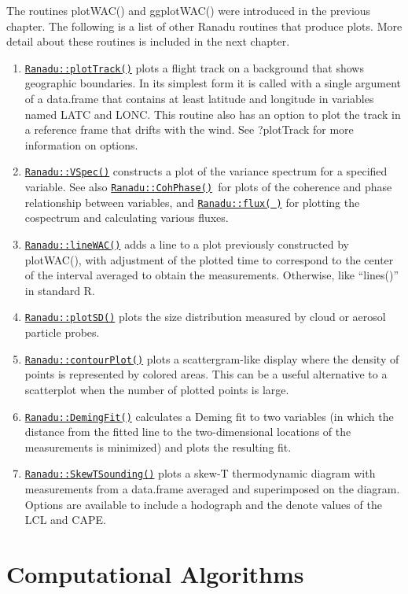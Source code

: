 \documentclass[12pt,english]{report}\usepackage[]{graphicx}\usepackage[]{color}
\begin{document}
The routines plotWAC() and ggplotWAC() were introduced in the previous
chapter. The following is a list of other Ranadu routines that produce
plots. More detail about these routines is included in the next chapter.
\begin{enumerate}
\item \texttt{\uline{Ranadu::plotTrack()}} plots a flight track on a
background that shows geographic boundaries. In its simplest form
it is called with a single argument of a data.frame that contains
at least latitude and longitude in variables named LATC and LONC.
This routine also has an option to plot the track in a reference frame
that drifts with the wind. See ?plotTrack for more information on
options.
\item \texttt{\uline{Ranadu::VSpec()}} constructs a plot of the variance
spectrum for a specified variable. See also \texttt{\uline{Ranadu::CohPhase()}}\texttt{
}for plots of the coherence and phase relationship between variables,
and \texttt{\uline{Ranadu::flux( )}} for plotting the cospectrum
and calculating various fluxes.
\item \texttt{\uline{Ranadu::lineWAC()}} adds a line to a plot previously
constructed by plotWAC(), with adjustment of the plotted time to correspond
to the center of the interval averaged to obtain the measurements.
Otherwise, like ``lines()'' in standard R.
\item \texttt{\uline{Ranadu::plotSD()}} plots the size distribution measured
by cloud or aerosol particle probes.
\item \texttt{\uline{Ranadu::contourPlot()}} plots a scattergram-like
display where the density of points is represented by colored areas.
This can be a useful alternative to a scatterplot when the number
of plotted points is large.
\item \texttt{\uline{Ranadu::DemingFit()}} calculates a Deming fit to
two variables (in which the distance from the fitted line to the two-dimensional
locations of the measurements is minimized) and plots the resulting
fit.
\item \texttt{\uline{Ranadu::SkewTSounding()}} plots a skew-T thermodynamic
diagram with measurements from a data.frame averaged and superimposed
on the diagram. Options are available to include a hodograph and the
denote values of the LCL and CAPE.
\end{enumerate}

\section{Computational Algorithms}
\end{document}
